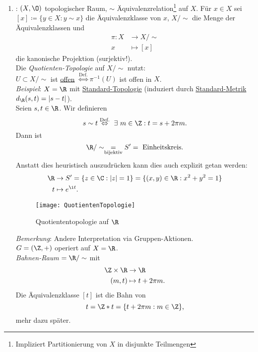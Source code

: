 \begin{remark}
\begin{enumerate}
    \item {}: \( (X, \O) \) topologischer Raum, \( \sim \) Äquivalenzrelation\footnote{Impliziert Partitionierung von \( X \) in disjunkte Teilmengen} auf \( X \). Für \( x \in X \) sei \( [x] \coloneqq  \{ y \in X : y \sim x \} \) die Äquivalenzklasse von \( x \), \( X/\sim \) die Menge der Äquivalenzklassen und
    \begin{align*}
      \pi : X &\to X/\sim \\
      x &\mapsto [x]
    \end{align*}
    die kanonische Projektion (surjektiv!). \\
    Die \emph{Quotienten-Topologie} auf \( X/\sim \) nutzt: \\
    \( U \subset X/\sim \) ist \underline{offen} \( \overset{\text{Def.}}{\Leftrightarrow} \pi^{-1}(U) \) ist offen in \( X \). \\
    \emph{Beispiel}: \( X = \R \) mit \hyperref[bsp:standardtopologie]{Standard-Topologie} (induziert durch \hyperref[bsp:standardmetrik]{Standard-Metrik} \( d_\R(s,t) = \vert s-t \vert \)). \\
    Seien \( s, t \in \R \). Wir definieren
    \begin{equation*}
      s \sim t \overset{\text{Def.}}{\Leftrightarrow} \ \exists \ m \in \Z : t = s + 2\pi m\text{.}
    \end{equation*}
    Dann ist
    \begin{equation*}
      \R/\sim \underset{\text{bijektiv}}{=} S' = \text{ Einheitskreis}\text{.}
    \end{equation*}
    Anstatt dies heuristisch auszudrücken kann dies auch explizit getan werden:
    \begin{align*}
      \R &\to S' = \{ z \in \C : \vert z \vert = 1 \} = \{ (x, y) \in \R : x^2+y^2 = 1 \} \\
      t &\mapsto e^{\i t}\text{.}
    \end{align*}
    \begin{figure}[H]
      \texttt{[image: QuotientenTopologie]}
      \caption{Quotiententopologie auf \( \R \)}
    \end{figure}
    \emph{Bemerkung}: Andere Interpretation via Gruppen-Aktionen. \\
    \( G = (\Z, +) \) operiert auf \( X = \R \). \\
    \emph{Bahnen-Raum} \( = \R/\sim \) mit
    \begin{align*}
      \Z \times \R &\to \R \\
      (m, t) &\mapsto t + 2\pi m\text{.}
    \end{align*}
    Die Äquivalenzklasse \( [t] \) ist die Bahn von
    \begin{equation*}
      t = \Z*t = \{ t+2\pi m : m \in \Z \}\text{,}
    \end{equation*}
    mehr dazu später.
  \end{enumerate}
\end{remark}

